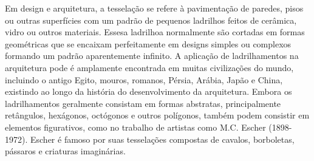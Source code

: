 Em design e arquitetura, a tesselação se refere à pavimentação de paredes, pisos ou outras superfícies com um padrão de pequenos ladrilhos feitos de cerâmica, vidro ou outros materiais. Essesa ladrilhoa normalmente são cortadas em formas geométricas que se encaixam perfeitamente em designs simples ou complexos formando um padrão aparentemente infinito. A aplicação de ladrilhamentos  na arquitetura pode é  amplamente encontrada em muitas civilizações do mundo, incluindo o antigo Egito, mouros, romanos, Pérsia, Arábia, Japão e China, existindo ao longo da história do desenvolvimento da arquitetura. Embora os ladrilhamentos geralmente consistam em formas abstratas, principalmente retângulos, hexágonos, octógonos e outros polígonos, também podem consistir em elementos figurativos, como no trabalho de artistas como M.C. Escher (1898-1972). Escher é famoso por suas tesselações compostas de cavalos, borboletas, pássaros e criaturas imaginárias.


